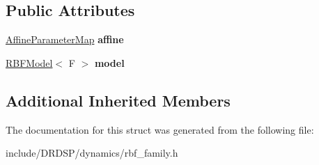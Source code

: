 \subsection*{Public Attributes}
\begin{DoxyCompactItemize}
\item 
\hypertarget{struct_d_r_d_s_p_1_1_r_b_f_family_a9ddb0a2cd7e34a292e8f46f5b09b82c6}{\hyperlink{struct_d_r_d_s_p_1_1_affine_parameter_map}{Affine\-Parameter\-Map} {\bfseries affine}}\label{struct_d_r_d_s_p_1_1_r_b_f_family_a9ddb0a2cd7e34a292e8f46f5b09b82c6}

\item 
\hypertarget{struct_d_r_d_s_p_1_1_r_b_f_family_ad84edb55f9f9cca4ebc0f6e63e065919}{\hyperlink{struct_d_r_d_s_p_1_1_r_b_f_model}{R\-B\-F\-Model}$<$ F $>$ {\bfseries model}}\label{struct_d_r_d_s_p_1_1_r_b_f_family_ad84edb55f9f9cca4ebc0f6e63e065919}

\end{DoxyCompactItemize}
\subsection*{Additional Inherited Members}


The documentation for this struct was generated from the following file\-:\begin{DoxyCompactItemize}
\item 
include/\-D\-R\-D\-S\-P/dynamics/rbf\-\_\-family.\-h\end{DoxyCompactItemize}

